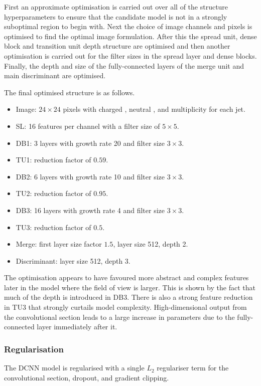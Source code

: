 First an approximate optimisation is carried out over all of the structure hyperparameters to ensure that the candidate model is not in a strongly suboptimal region to begin with. 
Next the choice of image channels and pixels is optimised to find the optimal image formulation. After this the spread unit, dense block and transition unit depth structure are optimised and then another optimisation is carried out for the filter sizes in the spread layer and dense blocks. Finally, the depth and size of the fully-connected layers of the merge unit and main discriminant are optimised. 

The final optimised structure is as follows.
\begin{itemize}[noitemsep]
    \item Image: $24\times{24}$ pixels with charged \pt, neutral \pt, and multiplicity for each jet.
    \item SL: 16 features per channel with a filter size of $5\times{}5$.
    \item DB1: 3 layers with growth rate 20 and filter size $3\times{}3$.
    \item TU1: reduction factor of $0.59$.
    \item DB2: 6 layers with growth rate 10 and filter size $3\times{}3$.
    \item TU2: reduction factor of $0.95$.
    \item DB3: 16 layers with growth rate 4 and filter size $3\times{}3$.
    \item TU3: reduction factor of $0.5$.
    \item Merge: first layer size factor $1.5$, layer size 512, depth 2.
    \item Discriminant: layer size 512, depth 3.
\end{itemize}
The optimisation appears to have favoured more abstract and complex features later in the model where the field of view is larger. This is shown by the fact that much of the depth is introduced in DB3. 
There is also a strong feature reduction in TU3 that strongly curtails model complexity. High-dimensional output from the convolutional section leads to a large increase in parameters due to the fully-connected layer immediately after it. 




\subsubsection{Regularisation}
The DCNN model is regularised with a single $L_2$ regulariser term for the convolutional section, dropout, and gradient clipping.

